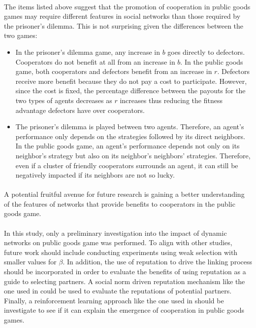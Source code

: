 \documentclass{article}
\begin{document}
	\paragraph{}The items listed above suggest that the promotion of cooperation in public goods games may require different features in social networks than those required by the prisoner's dilemma.  This is not surprising given the differences between the two games:

	\begin{itemize}
		\item In the prisoner's dilemma game, any increase in $b$ goes directly to defectors.  Cooperators do not benefit at all from an increase in $b$.  In the public goods game, both cooperators and defectors benefit from an increase in $r$.  Defectors receive more benefit because they do not pay a cost to participate.  However, since the cost is fixed, the percentage difference between the payouts for the two types of agents decreases as $r$ increases thus reducing the fitness advantage defectors have over cooperators.
		\item The prisoner's dilemma is played between two agents.  Therefore, an agent's performance only depends on the strategies followed by its direct neighbors.  In the public goods game, an agent's performance depends not only on its neighbor's strategy but also on its neighbor's neighbors' strategies.  Therefore, even if a cluster of friendly cooperators surrounds an agent, it can still be negatively impacted if its neighbors are not so lucky.
	\end{itemize}

	\paragraph{} A potential fruitful avenue for future research is gaining a better understanding of the features of networks that provide benefits to cooperators in the public goods game.
	\paragraph{}In this study, only a preliminary investigation into the impact of dynamic networks on public goods game was performed.  To align with other studies, future work should include conducting experiments using weak selection with smaller values for $\beta$.  In addition, the use of reputation to drive the linking process should be incorporated in order to evaluate the benefits of using reputation as a guide to selecting partners.  A social norm driven reputation mechanism like the one used in \cite{Maloney2015a} could be used to evaluate the reputations of potential partners.  Finally, a reinforcement learning approach like the one used in \cite{Macy1991} should be investigate to see if it can explain the emergence of cooperation in public goods games.
	\newpage

    
    
\end{document}
